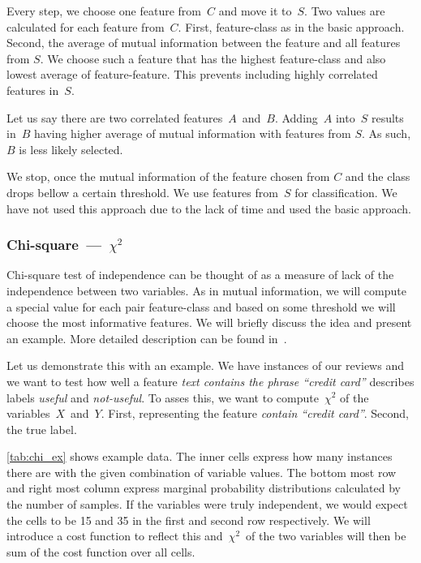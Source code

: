 Every step, we choose one feature from~$C$ and move it to~$S$.
Two values are calculated for each feature from~$C$.
First, feature-class as in the basic approach.
Second, the average of mutual information between the feature and all features from $S$.
We choose such a feature that has the highest feature-class and also lowest average of feature-feature.
This prevents including highly correlated features in~$S$.

Let us say there are two correlated features~$A$~and~$B$.
Adding~$A$ into~$S$ results in~$B$ having higher average of mutual information with features from $S$.
As such, $B$ is less likely selected.

We stop, once the mutual information of the feature chosen from $C$ and the class drops bellow a certain
threshold.
We use features from~$S$ for classification.
We have not used this approach due to the lack of time and used the basic approach.



\subsubsection{Chi-square~---~$\chi^2$}

Chi-square test of independence can be thought of
as a measure of lack of the independence between two variables.
As in mutual information,
we will compute a special value for each pair feature-class
and based on some threshold we will choose the most informative features.
We will briefly discuss the idea and present an example.
More detailed description can be found in~\citet{Hugh13}.


Let us demonstrate this with an example.
We have instances of our reviews and we want to test how well
a feature \textit{text contains the phrase ``credit card''} describes
labels \textit{useful} and \textit{not-useful}.
To asses this, we want to compute~$\chi^2$ of the variables~$X$~and~$Y$.
First, representing the feature \textit{contain ``credit card''}.
Second, the true label.

\autoref{tab:chi_ex} shows example data.
The inner cells express how many instances there are with the given combination of variable values.
The bottom most row and right most column express marginal probability distributions
calculated by the number of samples.
If the variables were truly independent,
we would expect the cells to be 15 and 35 in the first and second row respectively.
We will introduce a cost function to reflect this
and~$\chi^2$~of the two variables will then be sum of the cost function over all cells.


